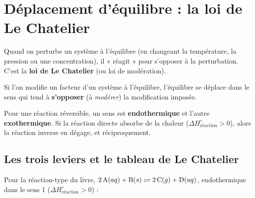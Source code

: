 \documentclass[11pt,a4paper]{article}
\newcommand{\dHr}{\Delta H^{\circ}_{\text{réaction}}}
\begin{document}
\section{Déplacement d'équilibre : la loi de Le Chatelier}
Quand on perturbe un système à l'équilibre (en changeant la température, la pression ou une
concentration), il « réagit » pour s'opposer à la perturbation. C'est la \textbf{loi de Le Chatelier}
(ou loi de modération).

\begin{theoreme}
Si l'on modifie un facteur d'un système à l'équilibre, l'équilibre se déplace dans le sens qui tend à
\textbf{s'opposer} (à \emph{modérer}) la modification imposée.
\end{theoreme}

\begin{remarque}
Pour une réaction réversible, un sens est \textbf{endothermique} et l'autre \textbf{exothermique}. Si la
réaction directe absorbe de la chaleur ($\dHr > 0$), alors la réaction inverse en dégage, et
réciproquement.
\end{remarque}

\subsection{Les trois leviers et le tableau de Le Chatelier}

Pour la réaction-type du livre, \;$2\,\ce{A}(aq) + \ce{B}(s) \rightleftharpoons 2\,\ce{C}(g) + \ce{D}(aq)$,\;
endothermique dans le sens 1 ($\dHr > 0$) :
\end{document}
